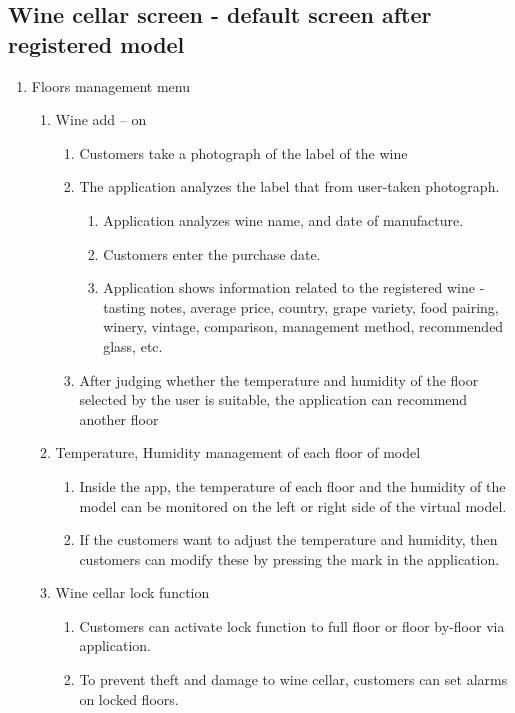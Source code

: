 \documentclass[conference]{IEEEtran}
\numberwithin{figure}{subsection}
\begin{document}
\subsection {\textbf{Wine cellar screen - default screen after registered model}}
\begin{enumerate}
\item Floors management menu

\begin{enumerate}
\item Wine add – on
 \begin{enumerate}
    \item Customers take a photograph of the label of the wine
    \item The application analyzes the label that from user-taken
	photograph.
	\begin{enumerate}
	\item Application analyzes wine name, and date of 
    manufacture.
    \item Customers enter the purchase date.
    \item Application shows information related to the 
    registered wine - tasting notes, average price, country,
    grape variety, food pairing, winery, vintage,
    comparison, management method, recommended
    glass, etc.
	\end{enumerate}
	\item After judging whether the temperature and humidity of the floor selected by the user is suitable, the application
can recommend another floor
\end{enumerate}

\item Temperature, Humidity management of each floor of model
\begin{enumerate}
    \item Inside the app, the temperature of each floor and the humidity of the model can be monitored on the left or right side of the virtual model.
    \item If the customers want to adjust the temperature and 	humidity, then customers can modify these by pressing 	the mark in the application.
\end{enumerate}

\item Wine cellar lock function
\begin{enumerate}
    \item Customers can activate lock function to full floor or 	floor by-floor via application.
    \item To prevent theft and damage to wine cellar, customers 	can set alarms on locked floors.
\end{enumerate}
\end{enumerate}


\end{enumerate}
\end{document}
